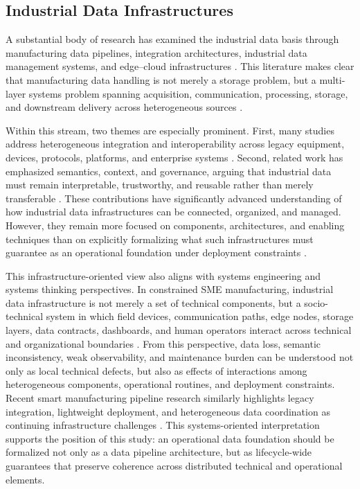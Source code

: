 \documentclass[systems,article,submit,pdftex,moreauthors]{Definitions/mdpi}
\begin{document}
\subsection{Industrial Data Infrastructures}
\label{sec:industrial_data_infrastructures}

A substantial body of research has examined the industrial data basis through manufacturing data pipelines, integration architectures, industrial data management systems, and edge--cloud infrastructures \cite{ismail2019manufacturing, raptis2019data, saqlain2019framework}. This literature makes clear that manufacturing data handling is not merely a storage problem, but a multi-layer systems problem spanning acquisition, communication, processing, storage, and downstream delivery across heterogeneous sources \cite{ismail2019manufacturing, odonovan2015industrial}.

Within this stream, two themes are especially prominent. First, many studies address heterogeneous integration and interoperability across legacy equipment, devices, protocols, platforms, and enterprise systems \cite{zeid2019interoperability, pereira2021towards, modoni2017enhancing}. Second, related work has emphasized semantics, context, and governance, arguing that industrial data must remain interpretable, trustworthy, and reusable rather than merely transferable \cite{hildebrandt2020ontology, morris2020foundations, westermann2022accessing}. These contributions have significantly advanced understanding of how industrial data infrastructures can be connected, organized, and managed. However, they remain more focused on components, architectures, and enabling techniques than on explicitly formalizing what such infrastructures must guarantee as an operational foundation under deployment constraints \cite{ismail2019manufacturing, raptis2019data, morris2020foundations}.

This infrastructure-oriented view also aligns with systems engineering and systems thinking perspectives. In constrained SME manufacturing, industrial data infrastructure is not merely a set of technical components, but a socio-technical system in which field devices, communication paths, edge nodes, storage layers, data contracts, dashboards, and human operators interact across technical and organizational boundaries \cite{Panchal2024,Rebentisch2022}. From this perspective, data loss, semantic inconsistency, weak observability, and maintenance burden can be understood not only as local technical defects, but also as effects of interactions among heterogeneous components, operational routines, and deployment constraints. Recent smart manufacturing pipeline research similarly highlights legacy integration, lightweight deployment, and heterogeneous data coordination as continuing infrastructure challenges \cite{Ceselli2025}. This systems-oriented interpretation supports the position of this study: an operational data foundation should be formalized not only as a data pipeline architecture, but as lifecycle-wide guarantees that preserve coherence across distributed technical and operational elements.
\end{document}

